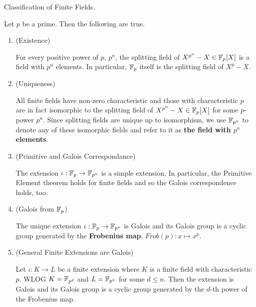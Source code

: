 \documentclass[../book.tex]{subfiles}
\begin{document}
\begin{thm} Classification of Finite Fields.
    
    Let $p$ be a prime. Then the following are true. 
    \begin{enumerate}
        \item (Existence)
        
        For every positive power of $p$, $p^n$, 
        the splitting field of $X^{p^n} - X \in \mathbb{F}_p[X]$
        is a field with $p^n$ elements.
        In particular, $\mathbb{F}_p$ itself is the splitting field of $X^p - X$. 
        \item (Uniqueness)
        
        All finite fields have non-zero characteristic and 
        those with characteristic $p$ are in fact isomorphic to
        the splitting field of $X^{p^n} - X \in \mathbb{F}_p[X]$ for some $p$-power $p^n$. 
        Since splitting fields are unique up to isomorphism,
        we use $\mathbb{F}_{p^n}$ to denote any of these isomorphic fields
        and refer to it as \textbf{the field with $p^n$ elements}. 
        \item (Primitive and Galois Correspondance)
        
        The extension $\iota : \mathbb{F}_p \to \mathbb{F}_{p^n}$ is a simple extension,
        In particular, the Primitive Element theorem holds for finite fields
        and so the Galois correspondence holds, too. 
        \item (Galois from $\mathbb{F}_p$)
        
        The unique extension $\iota : \mathbb{F}_p \to \mathbb{F}_{p^n}$ is Galois and 
        its Galois group is a cyclic group generated by 
        the \textbf{Frobenius map}, $Frob(p) : x \mapsto x^p$. 
        \item (General Finite Extensions are Galois)
        
        Let $\iota : K \to L$ be a finite extension where 
        $K$ is a finite field with characteristic $p$.
        WLOG $K = \mathbb{F}_{p^d}$ and $L = \mathbb{F}_{p^n}$ for some $d \leq n$.
        Then the extension is Galois and 
        its Galois group is a cyclic group generated by
        the $d$-th power of the Frobenius map.
        
        
    \end{enumerate}
    
\end{thm}
\end{document}
